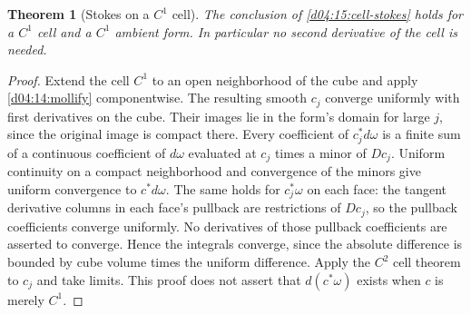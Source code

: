 \documentclass[11pt,oneside,openany]{book}
\newtheorem{theorem}{Theorem}[chapter]
\theoremstyle{definition}
\theoremstyle{remark}
\begin{document}
\begin{theorem}[Stokes on a $C^1$ cell]\label{d04:15:cell-stokes-c1}
The conclusion of \cref{d04:15:cell-stokes} holds for a $C^1$ cell and a
$C^1$ ambient form. In particular no second derivative of the cell is needed.
\end{theorem}
\begin{proof}
Extend the cell $C^1$ to an open neighborhood of the cube and apply
\cref{d04:14:mollify} componentwise. The resulting smooth $c_j$ converge
uniformly with first derivatives on the cube. Their images lie in the
form's domain for large $j$, since the original image is compact there.
Every coefficient of $c_j^*d\omega$ is a finite sum of a continuous
coefficient of $d\omega$ evaluated at $c_j$ times a minor of $Dc_j$.
Uniform continuity on a compact neighborhood and convergence of the minors
give uniform convergence to $c^*d\omega$. The same holds for $c_j^*\omega$
on each face: the tangent derivative columns in each face's pullback are
restrictions of $Dc_j$, so the pullback coefficients converge uniformly.
No derivatives of those pullback coefficients are asserted to converge.
Hence the integrals converge, since the absolute difference is
bounded by cube volume times the uniform difference. Apply the $C^2$ cell
theorem to $c_j$ and take limits. This proof does not assert that
$d(c^*\omega)$ exists when $c$ is merely $C^1$.
\end{proof}
\end{document}
